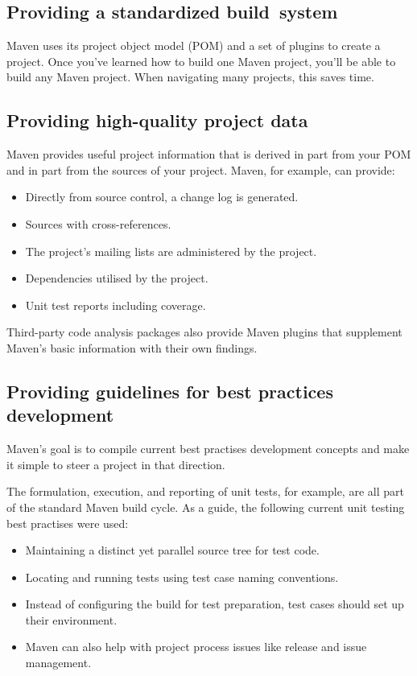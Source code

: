\subsection*{Providing a standardized build system}
\tab Maven uses its project object model (POM) and a set of plugins to create a project. Once you've learned how to build one Maven project, you'll be able to build any Maven project. When navigating many projects, this saves time.

\subsection*{Providing high-quality project data}
\tab Maven provides useful project information that is derived in part from your POM and in part from the sources of your project. Maven, for example, can provide:

\begin{itemize}
    \item Directly from source control, a change log is generated.
    \item Sources with cross-references.
    \item The project's mailing lists are administered by the project.
    \item Dependencies utilised by the project.
    \item Unit test reports including coverage.
\end{itemize}

\tab Third-party code analysis packages also provide Maven plugins that supplement Maven's basic information with their own findings.

\subsection*{Providing guidelines for best practices development}
\tab Maven's goal is to compile current best practises development concepts and make it simple to steer a project in that direction.

\tab The formulation, execution, and reporting of unit tests, for example, are all part of the standard Maven build cycle. As a guide, the following current unit testing best practises were used:

\begin{itemize}
    \item Maintaining a distinct yet parallel source tree for test code.
    \item Locating and running tests using test case naming conventions.
    \item Instead of configuring the build for test preparation, test cases should set up their environment.
    \item Maven can also help with project process issues like release and issue management.
\end{itemize}

